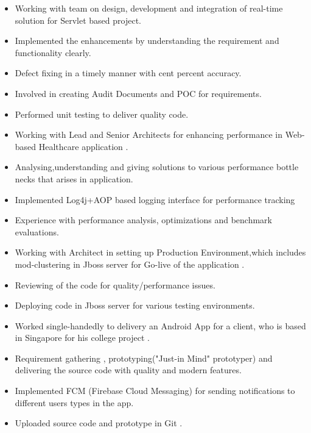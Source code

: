 \documentclass[10pt,a4paper,ragged2e]{altacv}
\begin{document}

\begin{itemize}
\item Working with team on design, development and integration of real-time solution for Servlet based project.
\small
\item Implemented the enhancements by understanding the requirement and functionality clearly.
\small
\item Defect fixing in a timely manner with cent percent accuracy.
\small
\item Involved in creating  Audit Documents and POC for requirements.
\small
\item Performed unit testing to deliver quality code.
\end{itemize}

\divider




\smallskip
{}

\begin{itemize}
\item Working with Lead and Senior Architects for enhancing performance in Web-based Healthcare application .
\small
\item Analysing,understanding and giving solutions to various performance bottle necks that arises in application.
\small
\item Implemented Log4j+AOP based logging interface for performance  tracking
\small
\item Experience with performance analysis, optimizations and benchmark evaluations.
\small
\item Working with Architect in setting up Production Environment,which includes mod-clustering in Jboss server for Go-live of the application .
\small
\item Reviewing of the code for quality/performance issues.
\small
\item Deploying code in Jboss server for various testing environments.  
\end{itemize}



\smallskip
{}

\begin{itemize}
\item Worked single-handedly to delivery an Android App for a client, who is based in Singapore for his college project .
\small
\item Requirement gathering , prototyping("Just-in Mind" prototyper) and delivering the source code with quality and modern features.
\small
\item Implemented FCM (Firebase Cloud Messaging) for sending notifications to different users types in the app.
\small
\item Uploaded source code and prototype in Git .
\end{itemize}
\end{document}
